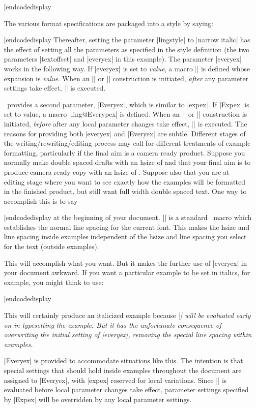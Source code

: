 \codedisplay
\ex[lingstyle=narrow italic]
|endcodedisplay

The various format specifications are packaged into a style
by saying:

\codedisplay
{}
|endcodedisplay
Thereafter, setting the parameter |lingstyle| to |narrow italic|
has the effect of setting all the parameters as specified in the
style definition (the two parameters |textoffset| and |everyex|
in this example). The parameter |everyex| works in the following
way.  If |everyex| is set to {\sl value\/}, a macro |\lingeveryex|
is defined whose expansion is {\sl value}.  When
an |\ex| or |\pex| construction is initiated, {\it after\/} any
parameter settings take effect, |\lingeveryex| is executed.

\ExPex\ provides a second parameter, |Everyex|, which is similar to
|expex|.  If |Expex| is set to value, a macro |ling@Everypex| is
defined. When
an |\ex| or |\pex| construction is initiated, {\it before\/} after any
local parameter changes take effect, |\lingEveryex| is executed.
The reasons for providing both |everyex| and |Everyex| are
subtle. Different stages of the writing/rewriting/editing process
may call for different treatments of example formatting,
particularly if the final aim is a camera ready product.  Suppose
you normally make double spaced drafts with an hsize of
\textdim{6.5 in} and that your final aim is to produce camera ready copy with
an hsize of \textdim{4.375 in}.  Suppose also that you are at
editing stage where you want to see exactly how the examples
will be formatted in the finished product, but still want full width
double spaced text.  One way to accomplish this is to say

\codedisplay
{}
|endcodedisplay
at the beginning of your document.  |\normalbaselines|
is a standard \Tex\ macro which establishes the normal line
spacing for the current font.  This makes the hsize and line
spacing inside examples independent of the hsize and line spacing
you select for the text (outside examples).

This will accomplish what you want.  But it makes the further use
of |everyex| in your document awkward.  If you want a particular
example to be set in italics, for example, you might think to
use:

\codedisplay
\ex[everyex=\it]
|endcodedisplay

\noindent This will certainly produce an italicized example
because |\it| will be evaluated early on in typesetting the
example.  But it has the unfortunate consequence of overwriting
the initial setting of |everyex|, removing the special line
spacing within examples.

|Everyex| is provided to accommodate situations like this. The
intention is that special settings that should hold inside
examples throughout the document are assigned to |Everyex|, with
|expex| reserved for local variations.  Since |\lingEveryex| is
evaluated before local parameter changes take effect, parameter
settings specified by |Expex| will be overridden by any local
parameter settings.

